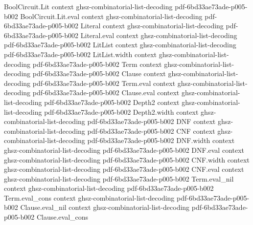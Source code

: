 \begin{lemma}
\label{BoolFourier.sum_char_S_at_zero}
\leanok
{}
\proofstep
  {BoolCircuit.Lit}
  {context}
  {ghsz-combinatorial-list-decoding}
  {pdf-6bd33ae73ade-p005-b002}
\proofstep
  {BoolCircuit.Lit.eval}
  {context}
  {ghsz-combinatorial-list-decoding}
  {pdf-6bd33ae73ade-p005-b002}
\proofstep
  {Literal}
  {context}
  {ghsz-combinatorial-list-decoding}
  {pdf-6bd33ae73ade-p005-b002}
\proofstep
  {Literal.eval}
  {context}
  {ghsz-combinatorial-list-decoding}
  {pdf-6bd33ae73ade-p005-b002}
\proofstep
  {LitList}
  {context}
  {ghsz-combinatorial-list-decoding}
  {pdf-6bd33ae73ade-p005-b002}
\proofstep
  {LitList.width}
  {context}
  {ghsz-combinatorial-list-decoding}
  {pdf-6bd33ae73ade-p005-b002}
\proofstep
  {Term}
  {context}
  {ghsz-combinatorial-list-decoding}
  {pdf-6bd33ae73ade-p005-b002}
\proofstep
  {Clause}
  {context}
  {ghsz-combinatorial-list-decoding}
  {pdf-6bd33ae73ade-p005-b002}
\proofstep
  {Term.eval}
  {context}
  {ghsz-combinatorial-list-decoding}
  {pdf-6bd33ae73ade-p005-b002}
\proofstep
  {Clause.eval}
  {context}
  {ghsz-combinatorial-list-decoding}
  {pdf-6bd33ae73ade-p005-b002}
\proofstep
  {Depth2}
  {context}
  {ghsz-combinatorial-list-decoding}
  {pdf-6bd33ae73ade-p005-b002}
\proofstep
  {Depth2.width}
  {context}
  {ghsz-combinatorial-list-decoding}
  {pdf-6bd33ae73ade-p005-b002}
\proofstep
  {DNF}
  {context}
  {ghsz-combinatorial-list-decoding}
  {pdf-6bd33ae73ade-p005-b002}
\proofstep
  {CNF}
  {context}
  {ghsz-combinatorial-list-decoding}
  {pdf-6bd33ae73ade-p005-b002}
\proofstep
  {DNF.width}
  {context}
  {ghsz-combinatorial-list-decoding}
  {pdf-6bd33ae73ade-p005-b002}
\proofstep
  {DNF.eval}
  {context}
  {ghsz-combinatorial-list-decoding}
  {pdf-6bd33ae73ade-p005-b002}
\proofstep
  {CNF.width}
  {context}
  {ghsz-combinatorial-list-decoding}
  {pdf-6bd33ae73ade-p005-b002}
\proofstep
  {CNF.eval}
  {context}
  {ghsz-combinatorial-list-decoding}
  {pdf-6bd33ae73ade-p005-b002}
\proofstep
  {Term.eval_nil}
  {context}
  {ghsz-combinatorial-list-decoding}
  {pdf-6bd33ae73ade-p005-b002}
\proofstep
  {Term.eval_cons}
  {context}
  {ghsz-combinatorial-list-decoding}
  {pdf-6bd33ae73ade-p005-b002}
\proofstep
  {Clause.eval_nil}
  {context}
  {ghsz-combinatorial-list-decoding}
  {pdf-6bd33ae73ade-p005-b002}
\proofstep
  {Clause.eval_cons}

\end{lemma}
